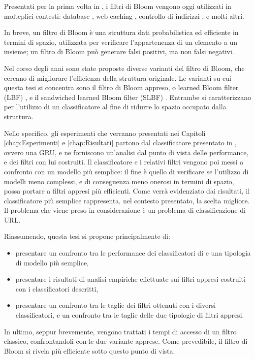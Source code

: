 \documentclass[../../main.tex]{subfiles}
\begin{document}
    
    Presentati per la prima volta in \cite{Bloom1970SpacetimeTI}, i filtri di Bloom vengono oggi utilizzati in molteplici contesti: database \cite{kraska2018case}, web caching \cite{Maggs15algorithmicnuggets}, controllo di indirizzi \cite{Dharmapurikar2006LongestPM}, e molti altri.

    In breve, un filtro di Bloom è una struttura dati probabilistica ed efficiente in termini di spazio, utilizzata per verificare l'appartenenza di un elemento a un insieme; un filtro di Bloom può generare falsi positivi, ma non falsi negativi.

    Nel corso degli anni sono state proposte diverse varianti del filtro di Bloom, che cercano di migliorare l'efficienza della struttura originale. Le varianti su cui questa tesi si concentra sono il filtro di Bloom appreso, o learned Bloom filter (LBF) \cite{kraska2018case}, e il sandwiched learned Bloom filter (SLBF) \cite{10.5555/3326943.3326986}. Entrambe si caratterizzano per l'utilizzo di un classificatore al fine di ridurre lo spazio occupato dalla struttura.

    Nello specifico, gli esperimenti che verranno presentati nei Capitoli \ref{chap:Esperimenti} e \ref{chap:Risultati} partono dal classificatore presentato in \cite{ma2020}, ovvero una GRU, e ne forniscono un'analisi dal punto di vista delle performance, e dei filtri con lui costruiti. Il classificatore e i relativi filtri vengono poi messi a confronto con un modello più semplice: il fine è quello di verificare se l'utilizzo di modelli meno complessi, e di conseguenza meno onerosi in termini di spazio, possa portare a filtri appresi più efficienti. Come verrà evidenziato dai risultati, il classificatore più semplice rappresenta, nel contesto presentato, la scelta migliore.
    Il problema che viene preso in considerazione è un problema di classificazione di URL.

    Riassumendo, questa tesi si propone principalmente di: 
    \begin{itemize}
        \item presentare un confronto tra le performance dei classificatori di \cite{ma2020} e una tipologia di modello più semplice,
        \item presentare i risultati di analisi empiriche effettuate sui filtri appresi costruiti con i classificatori descritti,
        \item presentare un confronto tra le taglie dei filtri ottenuti con i diversi classificatori, e un confronto tra le taglie delle due tipologie di filtri appresi.
    \end{itemize}
    In ultimo, seppur brevemente, vengono trattati i tempi di accesso di un filtro classico, confrontandoli con le due variante apprese. Come prevedibile, il filtro di Bloom si rivela più efficiente sotto questo punto di vista. 
\end{document}
